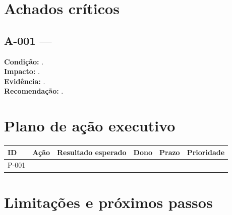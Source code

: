 \documentclass[11pt,a4paper]{article}
\begin{document}
\section{Achados críticos}
\subsection{A-001 — }
\textbf{Condição:} .\\
\textbf{Impacto:} .\\
\textbf{Evidência:} .\\
\textbf{Recomendação:} .

\section{Plano de ação executivo}
\begin{tabularx}{\textwidth}{P{1.1cm}Y P{3cm}P{2.4cm}P{2cm}P{1.6cm}}
\toprule
\textbf{ID} & \textbf{Ação} & \textbf{Resultado esperado} & \textbf{Dono} & \textbf{Prazo} & \textbf{Prioridade} \\
\midrule
P-001 &  &  &  &  &  \\
\bottomrule
\end{tabularx}

\section{Limitações e próximos passos}
\end{document}
